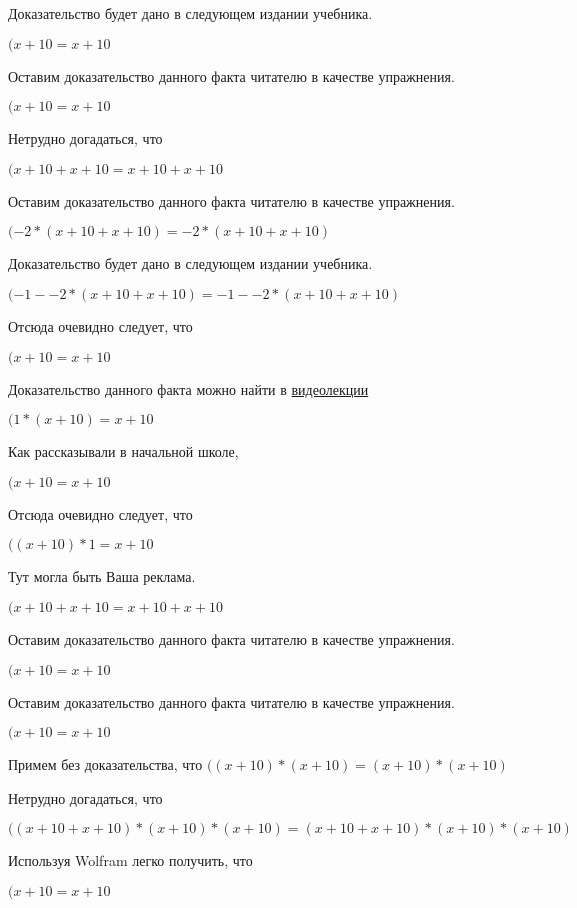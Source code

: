 \documentclass[12pt,a4paper,fleqn]{article}
\theoremstyle{definition}
\begin{document}
Доказательство будет дано в следующем издании учебника.

$( x  +  10  =  x  +  10 $

Оставим доказательство данного факта читателю в качестве упражнения.

$( x  +  10  =  x  +  10 $

Нетрудно догадаться, что

$( x  +  10  +  x  +  10  =  x  +  10  +  x  +  10 $

Оставим доказательство данного факта читателю в качестве упражнения.

$( -2  * ( x  +  10  +  x  +  10 ) =  -2  * ( x  +  10  +  x  +  10 )$

Доказательство будет дано в следующем издании учебника.

$( -1  -  -2  * ( x  +  10  +  x  +  10 ) =  -1  -  -2  * ( x  +  10  +  x  +  10 )$

Отсюда очевидно следует, что

$( x  +  10  =  x  +  10 $

Доказательство данного факта можно найти в \href{https://www.youtube.com/watch?v=dQw4w9WgXcQ}{видеолекции}

$( 1  * ( x  +  10 ) =  x  +  10 $

Как рассказывали в начальной школе,

$( x  +  10  =  x  +  10 $

Отсюда очевидно следует, что

$(( x  +  10 ) *  1  =  x  +  10 $

Тут могла быть Ваша реклама.

$( x  +  10  +  x  +  10  =  x  +  10  +  x  +  10 $

Оставим доказательство данного факта читателю в качестве упражнения.

$( x  +  10  =  x  +  10 $

Оставим доказательство данного факта читателю в качестве упражнения.

$( x  +  10  =  x  +  10 $

Примем без доказательства, что
$(( x  +  10 ) * ( x  +  10 ) = ( x  +  10 ) * ( x  +  10 )$

Нетрудно догадаться, что

$(( x  +  10  +  x  +  10 ) * ( x  +  10 ) * ( x  +  10 ) = ( x  +  10  +  x  +  10 ) * ( x  +  10 ) * ( x  +  10 )$

Используя Wolfram легко получить, что

$( x  +  10  =  x  +  10 $
\end{document}
